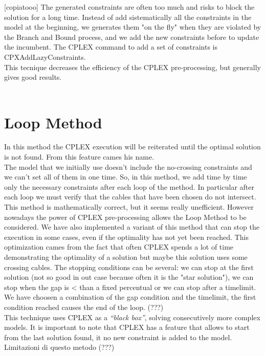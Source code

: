 [copiatooo]
The generated constraints are often too much and risks to block the solution for a long time. 
Instead of add sistematically all the constraints in the model at the beginning, we generates them "on the fly" when they are violated by the Branch and Bound process, and we add the new constraints before to update the incumbent. The \textsc{CPLEX} command to add a set of constraints is CPXAddLazyConstraints. \\
This tecnique decreases the efficiency of the \textsc{CPLEX} pre-processing, but generally gives good results. \\\\ 

\section{Loop Method}
In this method the \textsc{CPLEX} execution will be reiterated until the optimal solution is not found. From this feature cames his name. \\
The model that we initially use doesn't include the no-crossing constraints and we can't set all of them in one time. So, in this method, we add time by time only the necessary constraints after each loop of the method. In particular after each loop we must verify that the cables that have been chosen do not intersect.\\
This method is mathematically correct, but it seems really unefficient. However nowadays the power of \textsc{CPLEX} pre-processing allows the Loop Method to be considered. We have also implemented a variant of this method that can stop the execution in some cases, even if the optimality has not yet been reached. This optimization cames from the fact that often \textsc{CPLEX} spends a lot of time demonstrating the optimality of a solution but maybe this solution uses some crossing cables. The stopping conditions can be several: we can stop at the first solution (not so good in out case because often it is the "star solution"), we can stop when the gap is < than a fixed percentual or we can stop after a timelimit. We have choosen a combination of the gap condition and the timelimit, the first condition reached causes the end of the loop. (???)\\
This technique uses \textsc{CPLEX} as a \textit{“black box”}, solving consecutively more complex models. It is important to note that \textsc{CPLEX} has a feature that allows to start from the last solution found, it no new constraint is added to the model. Limitazioni di questo metodo (???)
